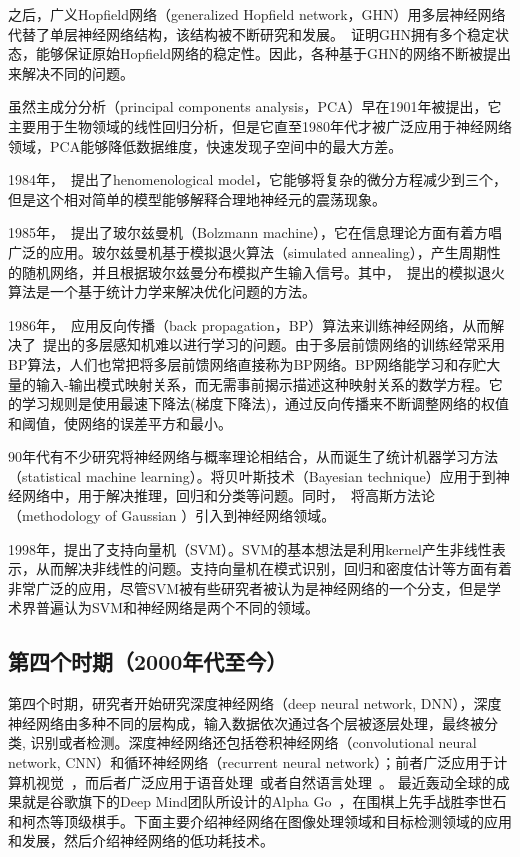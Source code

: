 之后，广义Hopfield网络（generalized Hopfield network，GHN）用多层神经网络代替了单层神经网络结构，该结构被不断研究和发展。~\citet{zurada1996generalized}证明GHN拥有多个稳定状态，能够保证原始Hopfield网络的稳定性。因此，各种基于GHN的网络不断被提出来解决不同的问题。

虽然主成分分析（principal components analysis，PCA）早在1901年被提出，它主要用于生物领域的线性回归分析，但是它直至1980年代才被广泛应用于神经网络领域，PCA能够降低数据维度，快速发现子空间中的最大方差。

1984年，~\citet{hindmarsh1984model}提出了henomenological model，它能够将复杂的微分方程减少到三个，但是这个相对简单的模型能够解释合理地神经元的震荡现象。

1985年，~\citet{ackley1985learning}提出了玻尔兹曼机（Bolzmann machine），它在信息理论方面有着方唱广泛的应用。玻尔兹曼机基于模拟退火算法（simulated annealing），产生周期性的随机网络，并且根据玻尔兹曼分布模拟产生输入信号。其中，~\citet{kirkpatrick1983optimization, vcerny1985thermodynamical}提出的模拟退火算法是一个基于统计力学来解决优化问题的方法。

1986年，~\citet{rumelhart1986learning}应用反向传播（back propagation，BP）算法来训练神经网络，从而解决了~\citet{minsky5paper}提出的多层感知机难以进行学习的问题。由于多层前馈网络的训练经常采用BP算法，人们也常把将多层前馈网络直接称为BP网络。BP网络能学习和存贮大量的输入-输出模式映射关系，而无需事前揭示描述这种映射关系的数学方程。它的学习规则是使用最速下降法(梯度下降法)，通过反向传播来不断调整网络的权值和阈值，使网络的误差平方和最小。

90年代有不少研究将神经网络与概率理论相结合，从而诞生了统计机器学习方法（statistical machine learning）。\citet{mackay1992practical, bishop1995neural}将贝叶斯技术（Bayesian technique）应用于到神经网络中，用于解决推理，回归和分类等问题。同时，~\citet{williams1996gaussian}将高斯方法论（methodology of Gaussian ）引入到神经网络领域。

1998年，\citet{vapnik1998statistical}提出了支持向量机（SVM）。SVM的基本想法是利用kernel产生非线性表示，从而解决非线性的问题。支持向量机在模式识别，回归和密度估计等方面有着非常广泛的应用，尽管SVM被有些研究者被认为是神经网络的一个分支，但是学术界普遍认为SVM和神经网络是两个不同的领域。


\subsection{第四个时期（2000年代至今）}

第四个时期，研究者开始研究深度神经网络（deep neural network, DNN），深度神经网络由多种不同的层构成，输入数据依次通过各个层被逐层处理，最终被分类, 识别或者检测。深度神经网络还包括卷积神经网络（convolutional neural network, CNN）和循环神经网络（recurrent neural network）；前者广泛应用于计算机视觉~\cite{krizhevsky2012imagenet,simonyan2014very, ren2015faster}，而后者广泛应用于语音处理~\cite{hinton2012deep, amodei2015deep, ze2013statistical}或者自然语言处理~\cite{conneau2016very}。
最近轰动全球的成果就是谷歌旗下的Deep Mind团队所设计的Alpha Go~\cite{moyer2016google}，在围棋上先手战胜李世石和柯杰等顶级棋手。下面主要介绍神经网络在图像处理领域和目标检测领域的应用和发展，然后介绍神经网络的低功耗技术。

